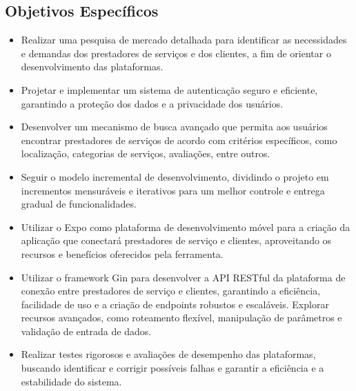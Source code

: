 \subsection{Objetivos Específicos}
\begin{itemize}
  \item Realizar uma pesquisa de mercado detalhada para identificar as necessidades e demandas dos prestadores de serviços e dos clientes, a fim de orientar o desenvolvimento das plataformas.
  \item Projetar e implementar um sistema de autenticação seguro e eficiente, garantindo a proteção dos dados e a privacidade dos usuários.
  \item Desenvolver um mecanismo de busca avançado que permita aos usuários encontrar prestadores de serviços de acordo com critérios específicos, como localização, categorias de serviços, avaliações, entre outros.
  \item Seguir o modelo incremental de desenvolvimento, dividindo o projeto em incrementos mensuráveis e iterativos para um melhor controle e entrega gradual de funcionalidades.
  \item Utilizar o Expo como plataforma de desenvolvimento móvel para a criação da aplicação que conectará prestadores de serviço e clientes, aproveitando os recursos e benefícios oferecidos pela ferramenta.
  \item Utilizar o framework Gin para desenvolver a API RESTful da plataforma de conexão entre prestadores de serviço e clientes, garantindo a eficiência, facilidade de uso e a criação de endpoints robustos e escaláveis. Explorar recursos avançados, como roteamento flexível, manipulação de parâmetros e validação de entrada de dados.
  \item Realizar testes rigorosos e avaliações de desempenho das plataformas, buscando identificar e corrigir possíveis falhas e garantir a eficiência e a estabilidade do sistema.
\end{itemize}
